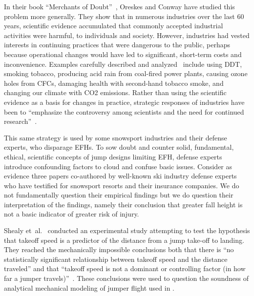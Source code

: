 \documentclass{article}
\begin{document}
In their book ``Merchants of Doubt''~\cite{Oreskes2010}, Oreskes and Conway
have studied this problem more generally. They show that in numerous industries
over the last 60 years, scientific evidence accumulated that commonly accepted
industrial activities were harmful, to individuals and society. However,
industries had vested interests in continuing practices that were dangerous to
the public, perhaps because operational changes would have led to significant,
short-term costs and inconvenience. Examples carefully described and analyzed~\cite{Oreskes2010}
include using DDT, smoking tobacco, producing acid rain from coal-fired power
plants, causing ozone holes from  CFCs, damaging health with second-hand
tobacco smoke, and changing our climate with CO2 emissions. Rather than using the
 scientific evidence as a basis for changes in practice, strategic responses of
industries have been to ``emphasize the controversy among scientists and the
need for continued research''~\cite{Oreskes2010}.

This same strategy is used by some snowsport industries and their defense experts,
who disparage EFHs.  To sow doubt and counter solid, fundamental, ethical, scientific
concepts of jump designs limiting EFH, defense experts introduce
confounding factors to cloud and confuse basic issues. Consider as evidence
three papers \cite{Shealy2010,Shealy2015,Scher2015} co-authored by well-known
ski industry defense experts who have testified for snowsport resorts and
their insurance companies. We do not fundamentally question their empirical
findings but we do question their interpretation of the findings, namely their
conclusion that greater fall height is not a basic indicator of greater risk of injury.

Shealy et~al.~\cite{Shealy2010} conducted an experimental study attempting to
test the hypothesis that takeoff speed is a predictor of the distance from a
jump take-off to landing. They reached the mechanically impossible conclusions
both that there is ``no statistically significant relationship between takeoff
speed and the distance traveled'' and that ``takeoff speed is not a dominant or
controlling factor (in how far a jumper travels)''~\cite{Shealy2010}. These
conclusions were used to question the soundness of analytical mechanical
modeling of jumper flight used in \cite{Hubbard2009,McNeil2012}.
\end{document}
